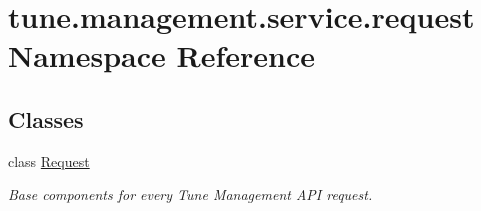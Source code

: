 \hypertarget{namespacetune_1_1management_1_1service_1_1request}{\section{tune.\-management.\-service.\-request Namespace Reference}
\label{namespacetune_1_1management_1_1service_1_1request}
}
\subsection*{Classes}
\begin{DoxyCompactItemize}
\item 
class \hyperlink{classtune_1_1management_1_1service_1_1request_1_1Request}{Request}
\begin{DoxyCompactList}\small\item\em Base components for every Tune Management A\-P\-I request. \end{DoxyCompactList}\end{DoxyCompactItemize}
